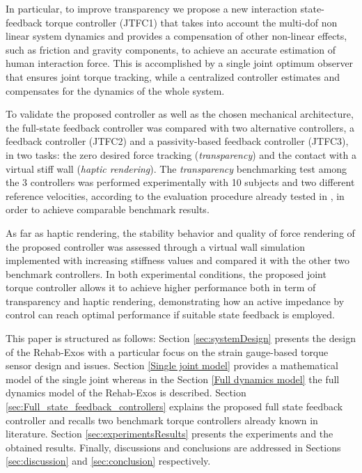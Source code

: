 \par In particular, to improve transparency we propose a new interaction state-feedback torque controller (JTFC1) that takes into account the multi-dof non linear system dynamics and provides a compensation of other non-linear effects, such as friction and gravity components, to achieve an accurate estimation of human interaction force.
This is accomplished by a single joint optimum observer that ensures joint torque tracking, while a centralized controller estimates and compensates for the dynamics of the whole system. 
\par To validate the proposed controller as well as the chosen mechanical architecture, the full-state feedback controller was  compared with two alternative controllers,  a  feedback controller (JTFC2) and a passivity-based feedback controller (JTFC3), in two tasks: the zero desired force tracking ({\em transparency}) and the contact with a virtual stiff wall ({\em haptic rendering}). 
The {\em transparency} benchmarking test among the 3 controllers was performed experimentally with 10 subjects and two different reference velocities, according to the evaluation procedure already tested in \cite{just2018exoskeleton}, in order to achieve comparable benchmark results.

As far as haptic rendering, the stability behavior and quality of force rendering of the proposed controller was assessed through a virtual wall simulation implemented with increasing  stiffness values and  compared it with the other two  benchmark controllers.
In  both experimental conditions,  the proposed joint torque controller allows it to achieve higher performance both in term of transparency and haptic rendering, demonstrating how an active impedance by control  can reach optimal performance if suitable state feedback is employed.



\par This paper is structured as follows: Section \ref{sec:systemDesign} presents the design of the Rehab-Exos with a particular focus on the strain gauge-based torque sensor design and issues. Section \ref{Single joint model} provides a mathematical model of the single joint whereas in the Section \ref{Full dynamics model} the full dynamics model of the Rehab-Exos is described. Section \ref{sec:Full_state_feedback_controllers} explains the proposed full state feedback controller and recalls two benchmark torque controllers already known in literature. Section \ref{sec:experimentsResults} presents the experiments and the obtained results.
Finally, discussions and conclusions are addressed in Sections \ref{sec:discussion} and \ref{sec:conclusion} respectively.  

